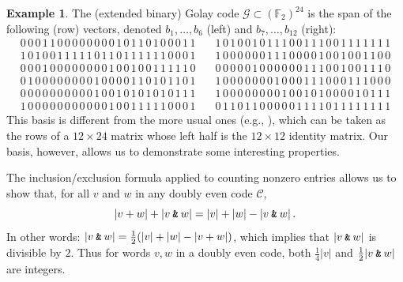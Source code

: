 \documentclass{article}
\theoremstyle{plain}
\theoremstyle{definition}
\newtheorem{example}{Example}
\def \cC {\mathcal{C}}
\def \cG {\mathcal{G}}
\def \FF {\mathbb{F}}
\newcommand{\AND}{\mathbin{\textup{\texttt{\&}}}}
\begin{document}
\begin{example}\label{example:Golay}
The (extended binary) Golay code $\cG \subset (\FF_2)^{24}$ is the span of the following (row) vectors, denoted $b_1,\ldots,b_6$ (left) and $b_7,\ldots,b_{12}$ (right):
\[	
	 \begin{array}{c}
     0\,0\,0\,1\,1\,0\,0\,0\,0\,0\,0\,0\,0\,1\,0\,1\,1\,0\,1\,0\,0\,0\,1\,1 \\
     1\,0\,1\,0\,0\,1\,1\,1\,1\,1\,0\,1\,1\,0\,1\,1\,1\,1\,1\,1\,0\,0\,0\,1 \\
     0\,0\,0\,1\,0\,0\,0\,0\,0\,0\,0\,0\,1\,0\,0\,1\,0\,0\,1\,1\,1\,1\,1\,0 \\
     0\,1\,0\,0\,0\,0\,0\,0\,0\,0\,1\,0\,0\,0\,0\,1\,1\,0\,1\,0\,1\,1\,0\,1 \\
     0\,0\,0\,0\,0\,0\,0\,0\,0\,0\,1\,0\,0\,1\,0\,1\,0\,1\,0\,1\,0\,1\,1\,1 \\
     1\,0\,0\,0\,0\,0\,0\,0\,0\,0\,0\,0\,1\,0\,0\,1\,1\,1\,1\,1\,0\,0\,0\,1
     \end{array}
\quad
    \begin{array}{c}
	 1\,0\,1\,0\,0\,1\,0\,1\,1\,1\,0\,0\,1\,1\,1\,0\,0\,1\,1\,1\,1\,1\,1\,1 \\
	 1\,0\,0\,0\,0\,0\,0\,1\,1\,1\,0\,0\,0\,0\,1\,0\,0\,1\,0\,0\,1\,1\,0\,0 \\
	 0\,0\,0\,0\,0\,1\,0\,0\,0\,0\,0\,0\,1\,1\,1\,0\,0\,1\,0\,0\,1\,1\,1\,0 \\
	 1\,0\,0\,0\,0\,0\,0\,0\,1\,0\,0\,0\,1\,1\,1\,0\,0\,0\,1\,1\,1\,0\,0\,0 \\
	 1\,0\,0\,0\,0\,0\,0\,0\,0\,1\,0\,0\,1\,0\,1\,0\,0\,0\,0\,1\,0\,1\,1\,1 \\
	 0\,1\,1\,0\,1\,1\,0\,0\,0\,0\,0\,1\,1\,1\,1\,0\,1\,1\,1\,1\,1\,1\,1\,1
	 \end{array}
\]
This basis is different from the more usual ones (e.g., \cite[Figure 3.4]{SPLAG}), which can be taken as the rows of a $12\times 24$ matrix whose left half is the $12\times 12$ identity matrix.
Our basis, however, allows us to demonstrate some interesting properties.
\end{example}

The inclusion/exclusion formula applied to counting nonzero entries allows us to show that, for all $v$ and $w$ in any doubly even code $\cC$,
\[
	|v+w| + |v\AND w| = |v| + |w| - |v\AND w|\,.
\]
In other words: $|v\AND w| = \frac12(|v| + |w| - |v+w|)$, which implies that $|v\AND w|$ is divisible by $2$.
Thus for words $v,w$ in a doubly even code, both $\frac14|v|$ and $\frac12|v\AND w|$ are integers.
\end{document}
